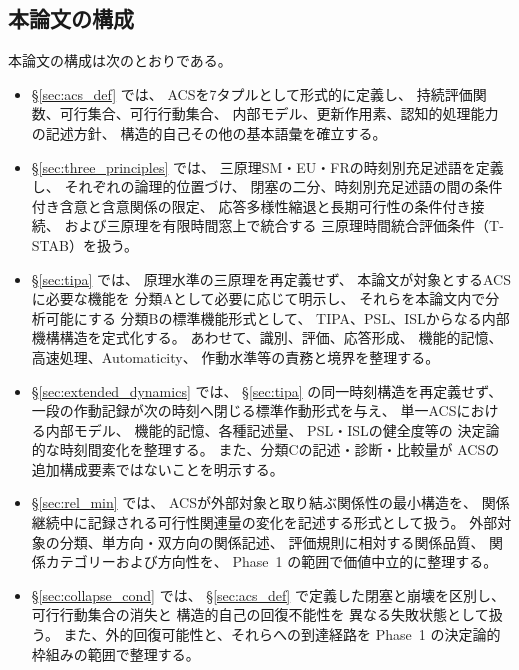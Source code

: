 \subsection{本論文の構成}
\label{subsec:roadmap}

本論文の構成は次のとおりである。

\begin{itemize}

  \item \S\ref{sec:acs_def} では、
    ACSを7タプルとして形式的に定義し、
    持続評価関数、可行集合、可行行動集合、
    内部モデル、更新作用素、認知的処理能力の記述方針、
    構造的自己その他の基本語彙を確立する。

  \item \S\ref{sec:three_principles} では、
    三原理SM・EU・FRの時刻別充足述語を定義し、
    それぞれの論理的位置づけ、
    閉塞の二分、時刻別充足述語の間の条件付き含意と含意関係の限定、
    応答多様性縮退と長期可行性の条件付き接続、
    および三原理を有限時間窓上で統合する
    三原理時間統合評価条件（T-STAB）を扱う。

  \item \S\ref{sec:tipa} では、
    原理水準の三原理を再定義せず、
    本論文が対象とするACSに必要な機能を
    分類Aとして必要に応じて明示し、
    それらを本論文内で分析可能にする
    分類Bの標準機能形式として、
    TIPA、PSL、ISLからなる内部機構構造を定式化する。
    あわせて、識別、評価、応答形成、
    機能的記憶、高速処理、Automaticity、
    作動水準等の責務と境界を整理する。

  \item \S\ref{sec:extended_dynamics} では、
    \S\ref{sec:tipa} の同一時刻構造を再定義せず、
    一段の作動記録が次の時刻へ閉じる標準作動形式を与え、
    単一ACSにおける内部モデル、
    機能的記憶、各種記述量、
    PSL・ISLの健全度等の
    決定論的な時刻間変化を整理する。
    また、分類Cの記述・診断・比較量が
    ACSの追加構成要素ではないことを明示する。

  \item \S\ref{sec:rel_min} では、
    ACSが外部対象と取り結ぶ関係性の最小構造を、
    関係継続中に記録される可行性関連量の変化を記述する形式として扱う。
    外部対象の分類、単方向・双方向の関係記述、
    評価規則に相対する関係品質、
    関係カテゴリーおよび方向性を、
    Phase~1 の範囲で価値中立的に整理する。

  \item \S\ref{sec:collapse_cond} では、
    \S\ref{sec:acs_def} で定義した閉塞と崩壊を区別し、
    可行行動集合の消失と
    構造的自己の回復不能性を
    異なる失敗状態として扱う。
    また、外的回復可能性と、それらへの到達経路を
    Phase~1 の決定論的枠組みの範囲で整理する。


\end{itemize}
